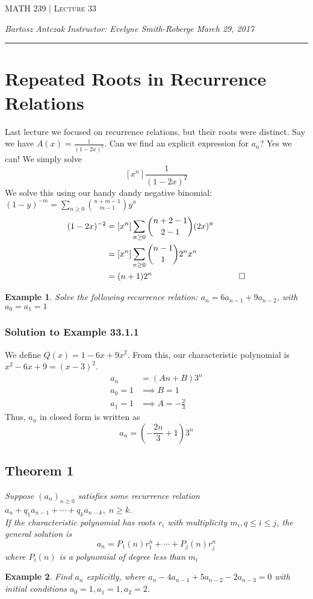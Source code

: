 \documentclass{report}
\newcommand{\lectureNum}{33}
\newcommand{\curDate}{March 29, 2017}
\newcommand{\course}{MATH 239}
\newcommand{\instructor}{Evelyne Smith-Roberge}
\newtheorem{ex}{Example}[section]
\begin{document}
\begin{center}
\begin{Large}
\textsc{\course{} | Lecture \lectureNum{}}
\end{Large}
\end{center} 
\noindent \textit{Bartosz Antczak} \hfill
\textit{Instructor: \instructor{}} \hfill
\textit{\curDate{}}
\rule{\textwidth}{0.4pt}
\onehalfspacing
\section{Repeated Roots in Recurrence Relations}
Last lecture we focused on recurrence relations, but their roots were distinct. Say we have $A(x) = \displaystyle \frac{1}{(1-2x)^2}$. Can we find an explicit expression for $a_n$? Yes we can! We simply solve
$$[x^n]\frac{1}{(1-2x)^2}$$
We solve this using our handy dandy negative binomial: $(1-y)^{-m} = \displaystyle\sum_{n \geq 0}{n + m - 1 \choose m-1}y^n$
\begin{align*}
[x^n](1-2x)^{-2} &= [x^n]\sum_{n \geq 0}{n+2-1 \choose 2-1}(2x)^n \\
&= [x^n]\sum_{n \geq 0}{n-1 \choose 1}2^nx^n\\
&= (n+1)2^n & \qed
\end{align*}
\begin{ex}
Solve the following recurrence relation: $a_n = 6a_{n-1} + 9a_{n-2}$, with $a_0 = a_1 = 1$
\end{ex}
\subsubsection{Solution to Example 33.1.1}
We define $Q(x) = 1 - 6x + 9x^2$. From this, our characteristic polynomial is $x^2 - 6x + 9 = (x-3)^2$.
\begin{align*}
a_n &= (An + B)3^n \\
a_0 = 1 &\implies B = 1 \\
a_1 = 1 &\implies A = -\frac{2}{3}
\end{align*}
Thus, $a_n$ in closed form is written as
$$a_n = \left(-\frac{2n}{3} + 1\right)3^n$$
\subsection{Theorem 1}
\begin{center}
\textit{Suppose ${(a_n)}_{n \geq 0}$ satisfies some recurrence relation $a_n + q_1a_{n-1} + \cdots + q_ka_{n-k}, \; n \geq k$.\\If the characteristic polynomial has roots $r_i$ with multiplicity $m_i, q \leq i \leq j$, the general solution is $$a_n = P_1(n)r_1^n + \cdots + P_j(n)r_j^n$$where $P_i(n)$ is a polynomial of degree less than $m_i$}
\end{center}\newpage
\begin{ex}
Find $a_n$ explicitly, where $a_n - 4a_{n-1} + 5a_{n-2}-2a_{n-3} = 0$ with initial conditions $a_0 = 1, a_1 = 1, a_2 = 2$.
\end{ex}
\end{document}
